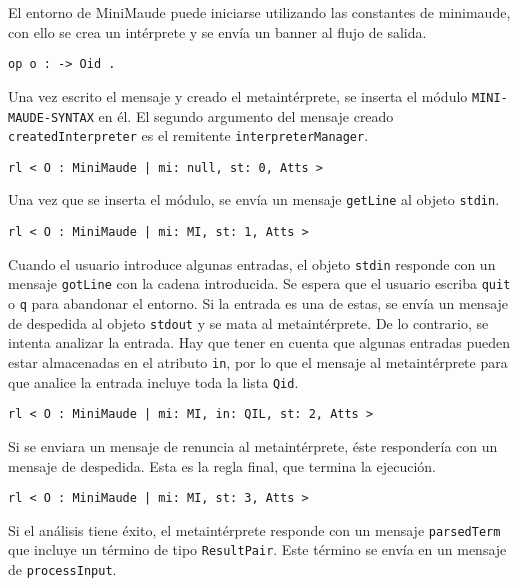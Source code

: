 El entorno de MiniMaude puede iniciarse utilizando las constantes de minimaude, con ello se crea un intérprete y se envía un banner al flujo de salida.

\begin{lstlisting}[language=Maude]
   op o : -> Oid .
\end{lstlisting}
\medskip

Una vez escrito el mensaje y creado el metaintérprete, se inserta el módulo \texttt{MINI-MAUDE-SYNTAX} en él. El segundo argumento del mensaje creado \texttt{createdInterpreter} es el remitente \texttt{interpreterManager}.

\begin{lstlisting}[language=Maude]
   rl < O : MiniMaude | mi: null, st: 0, Atts >
\end{lstlisting}
\medskip

Una vez que se inserta el módulo, se envía un mensaje \texttt{getLine} al objeto \texttt{stdin}.

\begin{lstlisting}[language=Maude]
   rl < O : MiniMaude | mi: MI, st: 1, Atts >
\end{lstlisting}
\medskip

\noindent
Cuando el usuario introduce algunas entradas, el objeto \texttt{stdin} responde con un mensaje \texttt{gotLine} con la cadena introducida. Se espera que el usuario escriba \texttt{quit} o \texttt{q} para abandonar el entorno. Si la entrada es una de estas, se envía un mensaje de despedida al objeto \texttt{stdout} y se mata al metaintérprete. De lo contrario, se intenta analizar la entrada. Hay que tener en cuenta que algunas entradas pueden estar almacenadas en el atributo \texttt{in}, por lo que el mensaje al metaintérprete para que analice la entrada incluye toda la lista \texttt{Qid}.

\begin{lstlisting}[language=Maude]
   rl < O : MiniMaude | mi: MI, in: QIL, st: 2, Atts >
\end{lstlisting}
\medskip

Si se enviara un mensaje de renuncia al metaintérprete, éste respondería con un mensaje de despedida. Esta es la regla final, que termina la ejecución.

\begin{lstlisting}[language=Maude]
   rl < O : MiniMaude | mi: MI, st: 3, Atts >
\end{lstlisting}
\medskip

Si el análisis tiene éxito, el metaintérprete responde con un mensaje \texttt{parsedTerm} que incluye un término de tipo \texttt{ResultPair}. Este término se envía en un mensaje de \texttt{processInput}.

